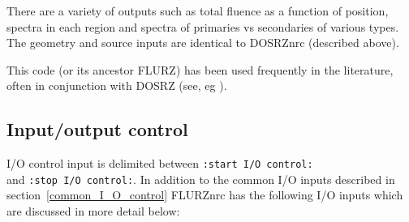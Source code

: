 \documentclass[12pt,twoside]{article}  %
\begin{document}
There are a variety of outputs such as total fluence as a function of
position, spectra in each region and spectra of primaries vs secondaries of
various types.  The geometry and source inputs are identical to DOSRZnrc
(described above).

This code (or its ancestor FLURZ) has been used frequently in the
literature, often in conjunction with DOSRZ (see, eg \cite{Ma91}).

\subsection{Input/output control}

I/O control input is delimited between \verb+:start I/O control:+\\
and \verb+:stop I/O control:+.  In addition to the common
I/O inputs described in section~\ref{common_I_O_control} FLURZnrc has the
following I/O inputs which are discussed in more detail below:
\end{document}
